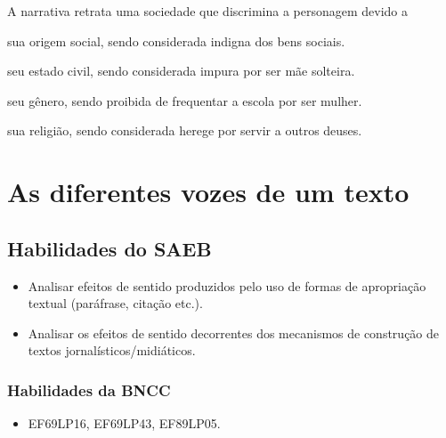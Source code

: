 A narrativa retrata uma sociedade que discrimina a personagem devido a

\begin{escolha}[itemsep=0pt]
\item sua origem social, sendo considerada indigna dos bens sociais.

\item seu estado civil, sendo considerada impura por ser mãe solteira.

\item seu gênero, sendo proibida de frequentar a escola por ser mulher.

\item sua religião, sendo considerada herege por servir a outros deuses.
\end{escolha}

\chapter{As diferentes vozes de um texto}

\section*{Habilidades do SAEB}

\begin{itemize}
\item Analisar efeitos de sentido produzidos
pelo uso de formas de apropriação textual (paráfrase, citação etc.).
\item Analisar os efeitos de sentido decorrentes dos mecanismos de construção
de textos jornalísticos/midiáticos.
\end{itemize}

\subsection{Habilidades da BNCC}

\begin{itemize}
\tightlist
\item
  EF69LP16, EF69LP43, EF89LP05.
\end{itemize}

